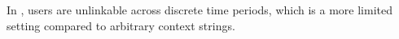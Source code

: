\\\\
In \cite{DBLP:conf/eurocrypt/DamgardDP06,DBLP:conf/ccs/CamenischHKLM06}, users are unlinkable across discrete time periods, which is a more limited setting compared to arbitrary context strings.